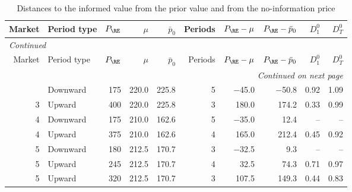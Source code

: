 \footnotesize
\begin{longtable}{rlrrrrrrrr}
\caption{Distances to the informed value from the prior value and from the no-information price}\label{tab:app-human-noinfo-distance}\\
\toprule
Market & Period type & $P_{\RE}$ & $\mu$ & $\bar p_0$ & Periods & $P_{\RE}-\mu$ & $P_{\RE}-\bar p_0$ & $D^0_1$ & $D^0_T$ \\
\midrule
\endfirsthead
\multicolumn{10}{l}{\textit{Continued}}\\
\toprule
Market & Period type & $P_{\RE}$ & $\mu$ & $\bar p_0$ & Periods & $P_{\RE}-\mu$ & $P_{\RE}-\bar p_0$ & $D^0_1$ & $D^0_T$ \\
\midrule
\endhead
\midrule
\multicolumn{10}{r}{\textit{Continued on next page}}\\
\endfoot
\bottomrule
\endlastfoot
3 & Downward & 175 & 220.0 & 225.8 & 5 & $-$45.0 & $-$50.8 & 0.92 & 1.09 \\
3 & Upward & 400 & 220.0 & 225.8 & 3 & 180.0 & 174.2 & 0.33 & 0.99 \\
4 & Downward & 175 & 210.0 & 162.6 & 5 & $-$35.0 & 12.4 & -- & -- \\
4 & Upward & 375 & 210.0 & 162.6 & 4 & 165.0 & 212.4 & 0.45 & 0.92 \\
5 & Downward & 180 & 212.5 & 170.7 & 3 & $-$32.5 & 9.3 & -- & -- \\
5 & Upward & 245 & 212.5 & 170.7 & 4 & 32.5 & 74.3 & 0.71 & 0.97 \\
5 & Upward & 320 & 212.5 & 170.7 & 3 & 107.5 & 149.3 & 0.44 & 0.83 \\
\end{longtable}
